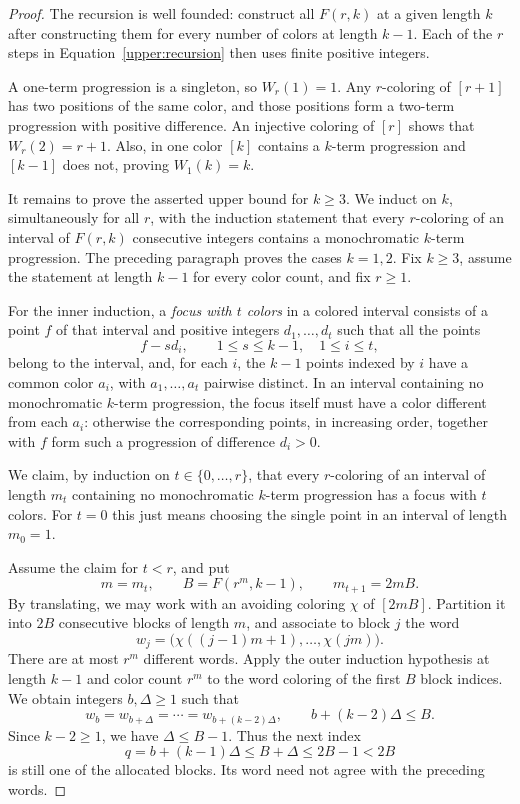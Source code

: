 \begin{proof}
The recursion is well founded: construct all $F(r,k)$ at a given
length $k$ after constructing them for every number of colors at
length $k-1$.  Each of the $r$ steps in
Equation~\eqref{upper:recursion} then uses finite positive integers.

A one-term progression is a singleton, so $W_r(1)=1$.
Any $r$-coloring of $[r+1]$ has two positions of the same color, and
those positions form a two-term progression with positive difference.
An injective coloring of $[r]$ shows that $W_r(2)=r+1$.
Also, in one color $[k]$ contains a $k$-term progression and $[k-1]$
does not, proving $W_1(k)=k$.

It remains to prove the asserted upper bound for $k\ge3$.
We induct on $k$, simultaneously for all $r$, with the induction
statement that every $r$-coloring of an interval of $F(r,k)$
consecutive integers contains a monochromatic $k$-term progression.
The preceding paragraph proves the cases $k=1,2$.
Fix $k\ge3$, assume the statement at length $k-1$ for every color
count, and fix $r\ge1$.

For the inner induction, a \emph{focus with $t$ colors} in a colored
interval consists of a point $f$ of that interval and positive integers
$d_1,\ldots,d_t$ such that all the points
\[
 f-sd_i,\qquad 1\le s\le k-1,\quad 1\le i\le t,
\]
belong to the interval, and, for each $i$, the $k-1$ points indexed by
$i$ have a common color $a_i$, with $a_1,\ldots,a_t$ pairwise
distinct.  In an interval containing no monochromatic $k$-term
progression, the focus itself must have a color different from each
$a_i$: otherwise the corresponding points, in increasing order,
together with $f$ form such a progression of difference $d_i>0$.

We claim, by induction on $t\in\{0,\ldots,r\}$, that every
$r$-coloring of an interval of length $m_t$ containing no monochromatic
$k$-term progression has a focus with $t$ colors.  For $t=0$ this just
means choosing the single point in an interval of length $m_0=1$.

Assume the claim for $t<r$, and put
\[
 m=m_t,\qquad B=F(r^m,k-1),\qquad m_{t+1}=2mB.
\]
By translating, we may work with an avoiding coloring $\chi$ of
$[2mB]$.  Partition it into $2B$ consecutive blocks of length $m$,
and associate to block $j$ the word
\[
 w_j=\bigl(\chi((j-1)m+1),\ldots,\chi(jm)\bigr).
\]
There are at most $r^m$ different words.  Apply the outer induction
hypothesis at length $k-1$ and color count $r^m$ to the word coloring
of the first $B$ block indices.  We obtain integers $b,\Delta\ge1$
such that
\begin{equation}
 w_b=w_{b+\Delta}=\cdots=w_{b+(k-2)\Delta},\qquad
 b+(k-2)\Delta\le B.
 \label{upper:matching-blocks}
\end{equation}
Since $k-2\ge1$, we have $\Delta\le B-1$.  Thus the next index
\begin{equation}
 q=b+(k-1)\Delta
 \le B+\Delta\le2B-1<2B
 \label{upper:next-block}
\end{equation}
is still one of the allocated blocks.  Its word need not agree with
the preceding words.


\end{proof}

